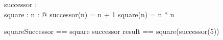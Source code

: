 \documentclass[a4paper,10pt,fleqn]{article}
\begin{document}
\begin{zed}
[A, B, C]
\end{zed}

\begin{axdef}
successor : \nat \fun \nat \\
square : \nat \fun \nat
\where
\forall n : \nat @ successor(n) = n + 1 \land square(n) = n * n
\end{axdef}

\begin{zed}
squareSuccessor == square \comp successor
\also
result == square(successor(5))
\end{zed}
\end{document}
